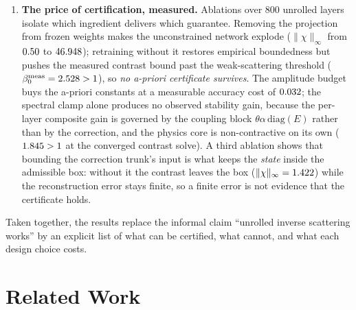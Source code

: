 \documentclass[journal,cmes,article,submit,moreauthors,pdftex]{Definitions/tsp}
\newcommand{\infn}[1]{\lVert #1 \rVert_{\infty}}
\newcommand{\numv}[1]{#1}
\begin{document}
\begin{enumerate}
\item \textbf{The price of certification, measured.} Ablations over $800$
unrolled layers isolate which ingredient delivers which guarantee. Removing the projection from frozen weights makes the unconstrained network
explode ($\infn{\chi}$ from $\numv{\chimax}$ to $\numv{\NumFrzUncOffChi}$); retraining without it
restores empirical boundedness but pushes the measured contrast bound past the weak-scattering
threshold ($\beta_0^{\mathrm{meas}}=\numv{\NumBetaMeas}>1$), so \emph{no a-priori certificate
survives}. The amplitude budget buys the a-priori constants at a measurable accuracy cost of
$\numv{\NumPriceDelta}$; the spectral clamp alone produces no observed stability gain, because the
per-layer composite gain is governed by the coupling block $\theta\alpha\,\mathrm{diag}(E)$ rather
than by the correction, and the physics core is non-contractive on its own
($\numv{\NumPhysSigma}>1$ at the converged contrast solve). A third ablation shows that bounding the
correction trunk's input is what keeps the \emph{state} inside the admissible box: without it the
contrast leaves the box ($\infn{\chi}=\numv{\NumAblUncPOffFbOffChi}$) while the reconstruction error
stays finite, so a finite error is not evidence that the certificate holds.
\end{enumerate}
Taken together, the results replace the informal claim ``unrolled inverse scattering works'' by an
explicit list of what can be certified, what cannot, and what each design choice costs.

\section{Related Work}\label{sec:related}
\end{document}
